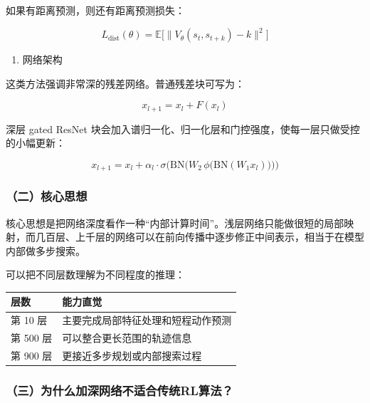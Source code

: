 如果有距离预测，则还有距离预测损失：

\[
L_{\mathrm{dist}}(\theta)
=
\mathbb{E}
\bigl[
\lVert
V_\theta(s_t,s_{t+k})-k
\rVert^{2}
\bigr]
\]

\begin{enumerate}
\def\labelenumi{\arabic{enumi}.}
\setcounter{enumi}{2}
\tightlist
\item
  网络架构
\end{enumerate}

这类方法强调非常深的残差网络。普通残差块可写为：

\[
x_{l+1}=x_l+F(x_l)
\]

深层 gated ResNet 块会加入谱归一化、归一化层和门控强度，使每一层只做受控的小幅更新：

\[
x_{l+1}
=
x_l
+
\alpha_l\cdot
\sigma
\bigl(
\mathrm{BN}
\bigl(
W_2\,
\phi
\bigl(
\mathrm{BN}(W_1x_l)
\bigr)
\bigr)
\bigr)
\]

\hypertarget{ux4e8cux6838ux5fc3ux601dux60f3}{%
\subsubsection{（二）核心思想}\label{ux4e8cux6838ux5fc3ux601dux60f3}}

核心思想是把网络深度看作一种``内部计算时间''。浅层网络只能做很短的局部映射，而几百层、上千层的网络可以在前向传播中逐步修正中间表示，相当于在模型内部做多步搜索。

可以把不同层数理解为不同程度的推理：

\begin{longtable}[]{@{}
  >{\raggedright\arraybackslash}p{}
  >{\raggedright\arraybackslash}p{}@{}}
\toprule
层数 & 能力直觉 \\
\midrule
\endhead
第 10 层 & 主要完成局部特征处理和短程动作预测 \\
第 500 层 & 可以整合更长范围的轨迹信息 \\
第 900 层 & 更接近多步规划或内部搜索过程 \\
\bottomrule
\end{longtable}

\hypertarget{ux4e09ux4e3aux4ec0ux4e48ux52a0ux6df1ux7f51ux7edcux4e0dux9002ux5408ux4f20ux7edfrlux7b97ux6cd5}{%
\subsubsection{（三）为什么加深网络不适合传统RL算法？}\label{ux4e09ux4e3aux4ec0ux4e48ux52a0ux6df1ux7f51ux7edcux4e0dux9002ux5408ux4f20ux7edfrlux7b97ux6cd5}}

